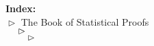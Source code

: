 \textbf{Index:} \\
$\vartriangleright$ The Book of Statistical Proofs \\
$\hphantom{\quad} \vartriangleright$ \Chaptername \\
$\hphantom{\quad} \hphantom{\quad} \vartriangleright$ \Sectionname